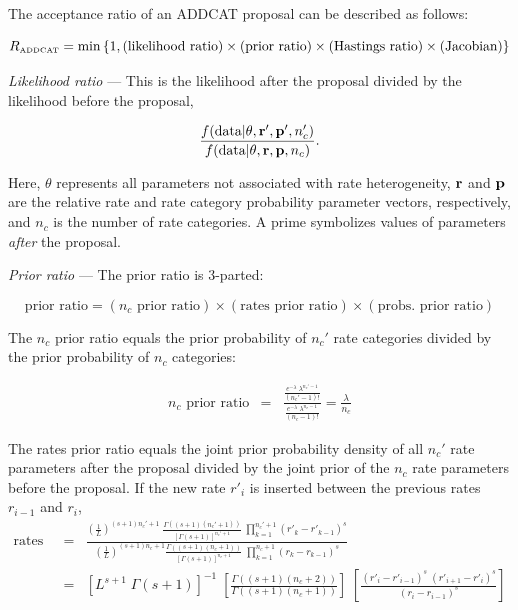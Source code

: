 \documentclass[12pt]{article}
\newcommand{\ncat}{n_c}
\begin{document}
The acceptance ratio of an ADDCAT proposal can be described as follows:

\[ R_{\mbox{\tiny ADDCAT}} = \min \left\{1, (\mbox{likelihood ratio}) \times (\mbox{prior ratio}) \times (\mbox{Hastings ratio}) \times (\mbox{Jacobian}) \right\} \]

{\em Likelihood ratio} --- This is the likelihood after the proposal divided by the likelihood before the proposal,

\[ \frac{f(\mbox{data} | {\bf \theta}, {\bf r}', {\bf p}', \ncat')}{f(\mbox{data} | {\bf \theta}, {\bf r}, {\bf p}, \ncat)}. \]

Here, $\theta$ represents all parameters not associated with rate heterogeneity, $\bf r$ and $\bf p$ are the relative rate and rate category probability parameter vectors, respectively, and $\ncat$ is the number of rate categories. A prime symbolizes values of parameters {\em after} the proposal.

{\em Prior ratio} --- The prior ratio is 3-parted:

\[ \mbox{prior ratio} = (\mbox{$\ncat$ prior ratio}) \times (\mbox{rates prior ratio}) \times (\mbox{probs. prior ratio}) \]

The $\ncat$ prior ratio equals the prior probability of $\ncat'$ rate categories divided by the prior probability of $\ncat$ categories:

\begin{eqnarray*}
\mbox{$\ncat$ prior ratio} & = & \frac{\frac{e^{-\lambda} \; \lambda^{\ncat' - 1}}{(\ncat' - 1)!}}{\frac{e^{-\lambda} \; \lambda^{\ncat - 1}}{(\ncat - 1)!}} =  \frac{\lambda}{\ncat}
\end{eqnarray*}

The rates prior ratio equals the joint prior probability density of all $\ncat'$ rate parameters after the proposal divided by the joint prior of the $\ncat$ rate parameters before the proposal. If the new rate $r'_i$ is inserted between the previous rates $r_{i-1}$ and $r_i$,
\begin{eqnarray*}
\mbox{rates prior ratio} 
  & = & \frac
  {
    \left( \frac{1}{L} \right)^{(s+1) \ncat' + 1} \; 
    \frac{ \Gamma\left( (s+1) (\ncat' + 1) \right) }{ \left[ \Gamma(s+1) \right]^{\ncat' + 1} } \;
    \prod_{k=1}^{\ncat' + 1} ({r'}_k - {r'}_{k-1})^s
  }
  {
    \left( \frac{1}{L} \right)^{(s+1) \ncat + 1}
    \frac{ \Gamma\left( (s+1) (\ncat + 1) \right) }{ \left[ \Gamma(s+1) \right]^{\ncat + 1} } \;
    \prod_{k=1}^{\ncat + 1} (r_k - r_{k-1})^s
  } \\
  & = & \left[ L^{s+1} \; \Gamma(s+1)\right]^{-1} \; 
  \left[ \frac{\Gamma\left( (s+1) (\ncat + 2) \right)}{\Gamma\left( (s+1) (\ncat + 1) \right)} \right] \;
  \left[ \frac{(r'_i - r'_{i-1})^s \; (r'_{i+1} - r'_i)^s}{(r_i - r_{i-1})^s} \right]
\end{eqnarray*}
\end{document}
